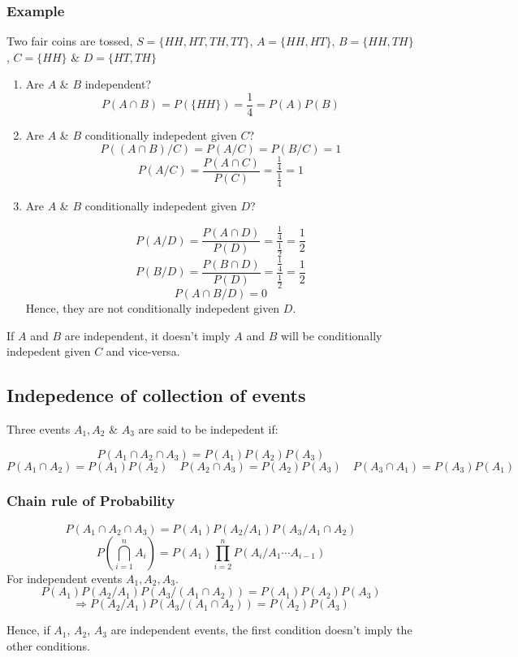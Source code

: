 \documentclass{article}
\begin{document}
\subsubsection{Example}
Two fair coins are tossed, $S=\{HH, HT, TH, TT \}$, $A=\{HH, HT \} $, $B=\{HH, TH\} $, $C=\{HH \}$ \& $D=\{HT, TH\}$

\begin{enumerate}
    \item Are $A$ \& $B$ independent?
    $$ P(A \cap B)= P(\{HH\}) = \frac{1}{4}= P(A)P(B)$$
    \item  Are $A$ \& $B$ conditionally indepedent given $C$?
    $$ P((A \cap B) /C)= P(A/C)=P(B/C)= 1$$
    $$ P(A/C)= \frac{P(A \cap C)}{P(C)}= \frac{\frac{1}{4}}{\frac{1}{4}}= 1$$
    \item Are $A$ \& $B$ conditionally indepedent given $D$?

    $$P(A/D)= \frac{P(A\cap D)}{P(D)}= \frac{\frac{1}{4}}{\frac{1}{2}}=\frac{1}{2} $$
    $$P(B/D)= \frac{P(B\cap D)}{P(D)}= \frac{\frac{1}{4}}{\frac{1}{2}}=\frac{1}{2} $$
    $$ P(A\cap B /D)= 0$$
    Hence, they are not conditionally indepedent given $D$.
\end{enumerate}

If $A$ and $B$ are independent, it doesn't imply $A$ and $B$ will be conditionally indepedent given $C$ and vice-versa.
\subsection{Indepedence of collection of events}

Three events $A_1, A_2$ \& $A_3$ are said to be indepedent if:

$$ P(A_1 \cap A_2 \cap A_3)=P(A_1)P(A_2)P(A_3)$$
$$ P(A_1 \cap A_2)=P(A_1)P(A_2)\quad P(A_2 \cap A_3)=P(A_2)P(A_3)\quad P(A_3 \cap A_1)=P(A_3)P(A_1)$$



\subsubsection{Chain rule of Probability}
$$ P(A_1 \cap A_2 \cap A_3)=P(A_1)P(A_2/A_1)P(A_3/A_1\cap A_2)$$
$$ P(\bigcap_{i=1}^n A_i)=P(A_1) \prod_{i=2}^n P(A_i/A_1\cdots A_{i-1})$$
For independent events $A_1, A_2, A_3$.
$$P(A_1)P(A_2/A_1)P(A_3/(A_1 \cap A_2))= P(A_1)P(A_2)P(A_3)$$
$$\Rightarrow P(A_2/A_1)P(A_3/(A_1 \cap A_2))= P(A_2)P(A_3)$$

Hence, if $A_1$, $A_2$, $A_3$ are independent events, the first condition doesn't imply the other conditions.
\end{document}
